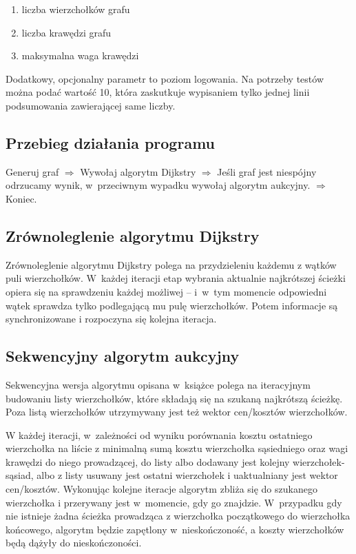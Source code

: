 \documentclass {article}
\begin{document}
\begin{enumerate}
 \item liczba wierzchołków grafu
 \item liczba krawędzi grafu
 \item maksymalna waga krawędzi
\end{enumerate}

Dodatkowy, opcjonalny parametr to poziom logowania. Na potrzeby testów można podać wartość 10, która zaskutkuje wypisaniem tylko jednej linii podsumowania zawierającej same liczby.

\subsection{Przebieg działania programu}

Generuj graf $\Rightarrow$ Wywołaj algorytm Dijkstry $\Rightarrow$ Jeśli graf jest niespójny odrzucamy wynik, w~przeciwnym wypadku wywołaj algorytm aukcyjny. $\Rightarrow$ Koniec.

\subsection{Zrównoleglenie algorytmu Dijkstry}

Zrównoleglenie algorytmu Dijkstry polega na przydzieleniu każdemu z wątków puli wierzchołków. W~każdej iteracji etap wybrania aktualnie najkrótszej ścieżki opiera się na sprawdzeniu każdej możliwej -- i~w~tym momencie odpowiedni wątek sprawdza tylko podlegającą mu pulę wierzchołków. Potem informacje są synchronizowane i rozpoczyna się kolejna iteracja.

\subsection{Sekwencyjny algorytm aukcyjny}

Sekwencyjna wersja algorytmu opisana w~książce \cite{Bertsekas1998} polega na iteracyjnym budowaniu listy wierzchołków, które składają się na szukaną najkrótszą ścieżkę. Poza listą wierzchołków utrzymywany jest też wektor cen/kosztów wierzchołków.

W każdej iteracji, w~zależności od wyniku porównania kosztu ostatniego wierzchołka na liście z minimalną sumą kosztu wierzchołka sąsiedniego oraz wagi krawędzi do niego prowadzącej, do listy albo dodawany jest kolejny wierzchołek-sąsiad, albo z listy usuwany jest ostatni wierzchołek i uaktualniany jest wektor cen/kosztów. Wykonując kolejne iteracje algorytm zbliża się do szukanego wierzchołka i przerywany jest w~momencie, gdy go znajdzie. W~przypadku gdy nie istnieje żadna ścieżka prowadząca z wierzchołka początkowego do wierzchołka końcowego, algorytm będzie zapętlony w~nieskończoność, a koszty wierzchołków będą dążyły do nieskończoności.
\end{document}
